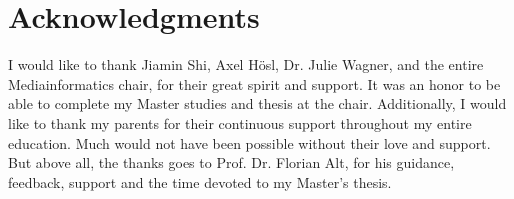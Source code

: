 
\section*{Acknowledgments}

I would like to thank Jiamin Shi, Axel H{\"o}sl, Dr. Julie Wagner, and the entire Mediainformatics chair, for their great spirit and support. It was an honor to be able to complete my Master studies and thesis at the chair. Additionally, I would like to thank my parents for their continuous support throughout my entire education. Much would not have been possible without their love and support. But above all, the thanks goes to Prof. Dr. Florian Alt, for his guidance, feedback, support and the time devoted to my Master's thesis.
